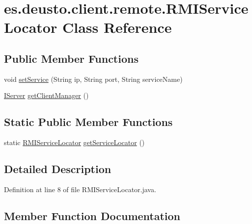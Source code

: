 \hypertarget{classes_1_1deusto_1_1client_1_1remote_1_1_r_m_i_service_locator}{}\section{es.\+deusto.\+client.\+remote.\+R\+M\+I\+Service\+Locator Class Reference}
\label{classes_1_1deusto_1_1client_1_1remote_1_1_r_m_i_service_locator}
\subsection*{Public Member Functions}
\begin{DoxyCompactItemize}
\item 
void \mbox{\hyperlink{classes_1_1deusto_1_1client_1_1remote_1_1_r_m_i_service_locator_a336e3b578829c4f0e99e66af6955640a}{set\+Service}} (String ip, String port, String service\+Name)
\item 
\mbox{\hyperlink{interfacees_1_1deusto_1_1server_1_1_i_server}{I\+Server}} \mbox{\hyperlink{classes_1_1deusto_1_1client_1_1remote_1_1_r_m_i_service_locator_ade08376a63a3e1a5ca512986e86478d5}{get\+Client\+Manager}} ()
\end{DoxyCompactItemize}
\subsection*{Static Public Member Functions}
\begin{DoxyCompactItemize}
\item 
static \mbox{\hyperlink{classes_1_1deusto_1_1client_1_1remote_1_1_r_m_i_service_locator}{R\+M\+I\+Service\+Locator}} \mbox{\hyperlink{classes_1_1deusto_1_1client_1_1remote_1_1_r_m_i_service_locator_a8054c4752675c3d8703a0ba79fb1c2c0}{get\+Service\+Locator}} ()
\end{DoxyCompactItemize}


\subsection{Detailed Description}


Definition at line 8 of file R\+M\+I\+Service\+Locator.\+java.



\subsection{Member Function Documentation}
\mbox{\label{classes_1_1deusto_1_1client_1_1remote_1_1_r_m_i_service_locator_ade08376a63a3e1a5ca512986e86478d5}} 

